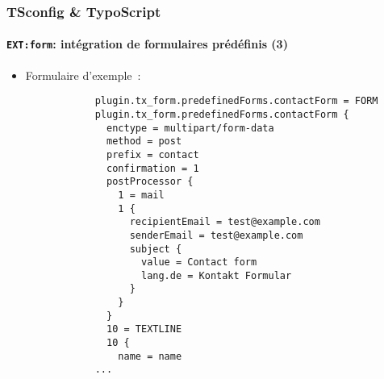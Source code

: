 \begin{frame}[fragile]
	\frametitle{TSconfig \& TypoScript}
	\framesubtitle{\texttt{EXT:form}: intégration de formulaires prédéfinis (3)}

	\lstset{basicstyle=\tiny\ttfamily}

	\begin{itemize}

		\item Formulaire d'exemple~:

		\begin{lstlisting}
			plugin.tx_form.predefinedForms.contactForm = FORM
			plugin.tx_form.predefinedForms.contactForm {
			  enctype = multipart/form-data
			  method = post
			  prefix = contact
			  confirmation = 1
			  postProcessor {
			    1 = mail
			    1 {
			      recipientEmail = test@example.com
			      senderEmail = test@example.com
			      subject {
			        value = Contact form
			        lang.de = Kontakt Formular
			      }
			    }
			  }
			  10 = TEXTLINE
			  10 {
			    name = name
			...
		\end{lstlisting}

	\end{itemize}

\end{frame}

